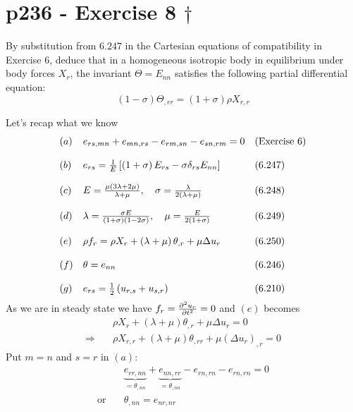 \section{p236 - Exercise 8 $\dagger$}
\begin{tcolorbox}
By substitution from $\mathbf{6.247}$ in the Cartesian equations of compatibility  in Exercise 6, deduce that in a homogeneous isotropic body in equilibrium under body forces $X_r$, the invariant $\Theta= E_{nn}$ satisfies the following partial differential equation:
$$\left(1-\sigma\right)\Theta_{,rr}= \left(1+\sigma\right)\rho X_{r,r}$$
\end{tcolorbox}
Let's recap what we know
\begin{align}
\begin{array}{lll}
(a)&e_{rs,mn}+e_{mn,rs}-e_{rm,sn}-e_{sn,rm}=0&\text{(Exercise 6)}\\\\
(b)&e_{rs}= \frac{1}{E}\left[\left(1+\sigma\right)E_{rs}-\sigma \delta_{rs} E_{nn}\right]&\text{(6.247)}\\\\
(c)&E=\frac{\mu\left(3\lambda+2\mu\right)}{\lambda+\mu}, \quad\sigma= \frac{\lambda}{2\left(\lambda+\mu\right)}&\text{(6.248)}\\\\
(d)&\lambda=\frac{\sigma E}{\left(1+\sigma\right)\left(1-2\sigma\right)}, \quad\mu =\frac{E}{2\left(1+\sigma\right)}&\text{(6.249)}\\\\
(e)&\rho f_r=\rho X_r +\left(\lambda+\mu\right)\theta_{,r}+\mu\Delta u_r&\text{(6.250)}\\\\
(f)&\theta = e_{nn}&\text{(6.246)}\\\\
(g)&e_{rs}=\frac{1}{2}\left(u_{r,s}+u_{s,r} \right)&\text{(6.210)}
\end{array}
\end{align}
As we are in steady state we have  $ f_r=\pdv[2]{u_r}{t}=0$ and $(e)$ becomes
\begin{align}
&\rho X_r +\left(\lambda+\mu\right)\theta_{,r}+\mu\Delta u_r=0\\
\Rightarrow\quad &\rho X_{r,r} +\left(\lambda+\mu\right)\theta_{,rr}+\mu\left(\Delta u_r\right)_{,r}=0
\end{align}
Put $m=n$ and $s=r$ in $(a)$:
\begin{align}
&\underbrace{e_{rr,nn}}_{=\theta_{,nn}}+\underbrace{e_{nn,rr}}_{=\theta_{,nn}}-e_{rn,rn}-e_{rn,rn}=0\\
\text{or}\quad & \theta_{,nn}=e_{nr,nr} 
\end{align}
